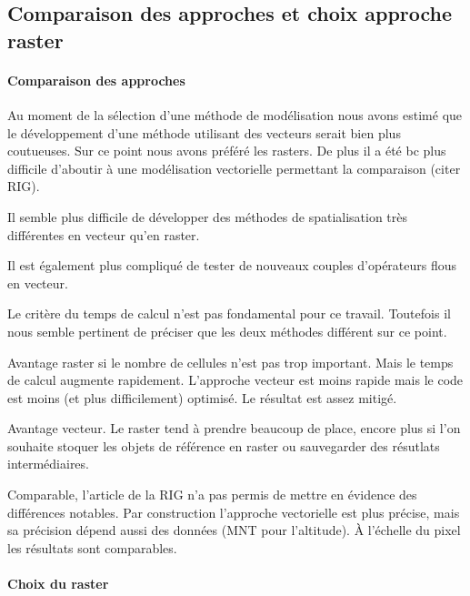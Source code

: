 \subsection{Comparaison des approches et choix approche raster}

\paragraph{Comparaison des approches}


Au moment de la sélection d'une méthode de modélisation nous avons
estimé que le développement d'une méthode utilisant des vecteurs
serait bien plus coutueuses. Sur ce point nous avons préféré les
rasters. De plus il a été bc plus difficile d'aboutir à une
modélisation vectorielle permettant la comparaison (citer RIG).


Il semble plus difficile de développer des méthodes de spatialisation
très différentes en vecteur qu'en raster.

Il est également plus compliqué de tester de nouveaux couples
d'opérateurs flous en vecteur.


Le critère du temps de calcul n'est pas fondamental pour ce
travail. Toutefois il nous semble pertinent de préciser que les deux
méthodes différent sur ce point.

Avantage raster si le nombre de cellules n'est pas trop
important. Mais le temps de calcul augmente rapidement. L'approche
vecteur est moins rapide mais le code est moins (et plus
difficilement) optimisé. Le résultat est assez mitigé.


Avantage vecteur. Le raster tend à prendre beaucoup de place, encore
plus si l'on souhaite stoquer les objets de référence en raster ou
sauvegarder des résutlats intermédiaires.


Comparable, l'article de la RIG n'a pas permis de mettre en évidence
des différences notables. Par construction l'approche vectorielle est
plus précise, mais sa précision dépend aussi des données (MNT pour
l'altitude). À l'échelle du pixel les résultats sont comparables.

\paragraph{Choix du raster}



